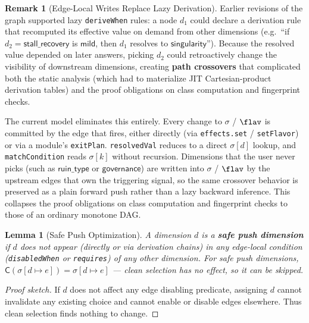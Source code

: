 \documentclass[11pt]{article}
\newtheorem{lemma}[theorem]{Lemma}
\theoremstyle{definition}
\newtheorem{remark}[theorem]{Remark}
\newcommand{\sel}{\sigma}              %
\newcommand{\clean}{\mathsf{C}}        %
\begin{document}
\begin{remark}[Edge-Local Writes Replace Lazy Derivation]\label{rem:crossover}
Earlier revisions of the graph supported lazy
\texttt{deriveWhen} rules: a node $d_1$ could declare a derivation rule
that recomputed its effective value on demand from other dimensions
(e.g.\ ``if $d_2 = \mathsf{stall\_recovery}$ is $\mathsf{mild}$, then
$d_1$ resolves to $\mathsf{singularity}$''). Because the resolved value
depended on later answers, picking $d_2$ could retroactively change the
visibility of downstream dimensions, creating \textbf{path crossovers}
that complicated both the static analysis (which had to materialize
JIT Cartesian-product derivation tables) and the proof obligations on
class computation and fingerprint checks.

The current model eliminates this entirely. Every change to $\sel$ /
$\flav$ is committed by the edge that fires, either directly (via
\texttt{effects.set} / \texttt{setFlavor}) or via a module's
\texttt{exitPlan}. \texttt{resolvedVal} reduces to a direct
$\sel[d]$ lookup, and \texttt{matchCondition} reads $\sel[k]$ without
recursion. Dimensions that the user never picks (such as
$\mathsf{ruin\_type}$ or $\mathsf{governance}$) are written into
$\sel$ / $\flav$ by the upstream edges that own the triggering signal,
so the same crossover behavior is preserved as a plain forward push
rather than a lazy backward inference. This collapses the proof
obligations on class computation and fingerprint checks to those of an
ordinary monotone DAG.
\end{remark}

\begin{lemma}[Safe Push Optimization]\label{lem:safepush}
A dimension $d$ is a \textbf{safe push dimension} if $d$ does not appear
(directly or via derivation chains) in any edge-local condition
(\texttt{disabledWhen} or \texttt{requires}) of any other dimension.
For safe push dimensions, $\clean(\sel[d\mapsto e]) = \sel[d\mapsto e]$
--- clean selection has no effect, so it can be skipped.
\end{lemma}

\begin{proof}[Proof sketch]
If $d$ does not affect any edge disabling predicate, assigning $d$ cannot
invalidate any existing choice and cannot enable or disable edges
elsewhere. Thus clean selection finds nothing to change.
\end{proof}


\end{document}
